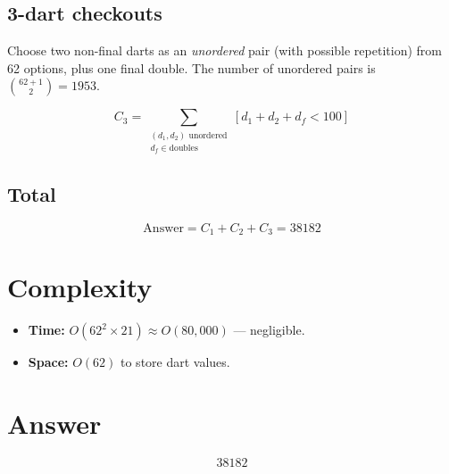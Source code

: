 \documentclass[12pt,a4paper]{article}
\begin{document}
\subsection{3-dart checkouts}

Choose two non-final darts as an \emph{unordered} pair (with possible repetition) from 62 options, plus one final double. The number of unordered pairs is $\binom{62 + 1}{2} = 1953$.

\[
C_3 = \sum_{\substack{(d_1, d_2) \text{ unordered} \\ d_f \in \text{doubles}}} [d_1 + d_2 + d_f < 100]
\]

\subsection{Total}

\[
\text{Answer} = C_1 + C_2 + C_3 = \boxed{38182}
\]

\section{Complexity}

\begin{itemize}
    \item \textbf{Time:} $O(62^2 \times 21) \approx O(80{,}000)$ --- negligible.
    \item \textbf{Space:} $O(62)$ to store dart values.
\end{itemize}

\section{Answer}

\[
\boxed{38182}
\]
\end{document}
